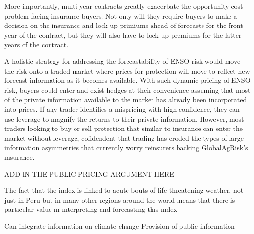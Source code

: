 \documentclass[authoryear]{article}
\begin{document}
\begin{itemize}
More importantly, multi-year contracts greatly exacerbate the opportunity cost problem facing insurance buyers. Not only will they require buyers to make a decision on the insurance and lock up primiums ahead of forecasts for the front year of the contract, but they will also have to lock up premiums for the latter years of the contract.

A holistic strategy for addressing the forecastability of ENSO risk would move the risk onto a traded market where prices for protection will move to reflect new forecast information as it becomes available. With such dynamic pricing of ENSO risk, buyers could enter and exist hedges at their convenience assuming that most of the private information available to the market has already been incorporated into prices. If any trader identifies a mispricing with high confidence, they can use leverage to magnify the returns to their private information. However, most traders looking to buy or sell protection that similar to insurance can enter the market without leverage, cofidendent that trading has eroded the types of large information asymmetries that currently worry reinsurers backing GlobalAgRisk's insurance.



ADD IN THE PUBLIC PRICING ARGUMENT HERE

The fact that the index is linked to acute bouts of life-threatening weather, not just in Peru but in many other regions around the world means that there is particular value in interpreting and forecasting this index. 

Can integrate information on climate change
Provision of public information



\end{itemize}
\end{document}

